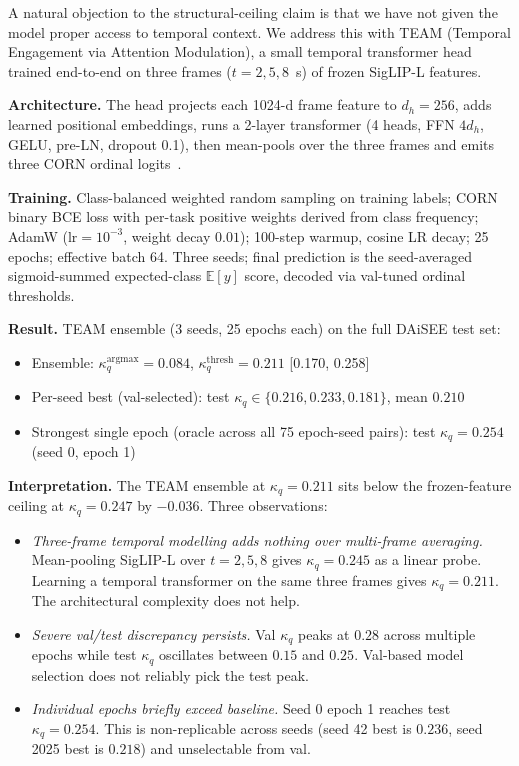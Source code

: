 A natural objection to the structural-ceiling claim is that we have
not given the model proper access to temporal context. We address
this with TEAM (Temporal Engagement via Attention Modulation), a
small temporal transformer head trained end-to-end on three frames
($t = 2, 5, 8$~s) of frozen SigLIP-L features.

\textbf{Architecture.} The head projects each 1024-d frame feature
to $d_h = 256$, adds learned positional embeddings, runs a 2-layer
transformer (4 heads, FFN $4 d_h$, GELU, pre-LN, dropout 0.1), then
mean-pools over the three frames and emits three CORN ordinal
logits~\cite{shi2023corn}.

\textbf{Training.} Class-balanced weighted random sampling on
training labels; CORN binary BCE loss with per-task positive
weights derived from class frequency; AdamW
($\mathrm{lr}=10^{-3}$, weight decay $0.01$); 100-step warmup,
cosine LR decay; 25 epochs; effective batch 64. Three seeds; final
prediction is the seed-averaged sigmoid-summed expected-class
$\mathbb{E}[y]$ score, decoded via val-tuned ordinal thresholds.

\textbf{Result.} TEAM ensemble (3 seeds, 25 epochs each) on the
full DAiSEE test set:
\begin{itemize}\itemsep0pt
  \item Ensemble: $\kappa_q^{\mathrm{argmax}} = 0.084$,
   $\kappa_q^{\mathrm{thresh}} = 0.211$ [0.170, 0.258]
  \item Per-seed best (val-selected): test $\kappa_q \in \{0.216,
   0.233, 0.181\}$, mean $0.210$
  \item Strongest single epoch (oracle across all 75 epoch-seed
   pairs): test $\kappa_q = 0.254$ (seed 0, epoch 1)
\end{itemize}

\textbf{Interpretation.} The TEAM ensemble at $\kappa_q = 0.211$
sits below the frozen-feature ceiling at $\kappa_q = 0.247$ by
$-0.036$. Three observations:
\begin{itemize}\itemsep0pt
  \item \emph{Three-frame temporal modelling adds nothing over
   multi-frame averaging.} Mean-pooling SigLIP-L over $t = 2, 5, 8$
   gives $\kappa_q = 0.245$ as a linear probe. Learning a temporal
   transformer on the same three frames gives $\kappa_q = 0.211$.
   The architectural complexity does not help.
  \item \emph{Severe val/test discrepancy persists.} Val $\kappa_q$
   peaks at $0.28$ across multiple epochs while test $\kappa_q$
   oscillates between $0.15$ and $0.25$. Val-based model selection
   does not reliably pick the test peak.
  \item \emph{Individual epochs briefly exceed baseline.} Seed 0
   epoch 1 reaches test $\kappa_q = 0.254$. This is non-replicable
   across seeds (seed 42 best is $0.236$, seed 2025 best is
   $0.218$) and unselectable from val.
\end{itemize}

